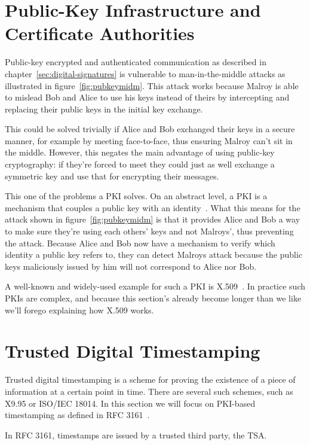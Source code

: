 \section{Public-Key Infrastructure and Certificate Authorities}\label{sec:public-key-infrastructure-and-certificate-authorities}
Public-key encrypted and authenticated communication as described in chapter~\ref{sec:digital-signatures}
is vulnerable to man-in-the-middle attacks as illustrated in figure~\ref{fig:pubkeymidm}.
This attack works because Malroy is able to mislead Bob and Alice to use his keys instead of theirs
by intercepting and replacing their public keys in the initial key exchange.

This could be solved trivially if Alice and Bob exchanged their keys in a secure manner,
for example by meeting face-to-face,
thus ensuring Malroy can't sit in the middle.
However, this negates the main advantage of using public-key cryptography:
if they're forced to meet they could just as well exchange a symmetric key and use that for encrypting
their messages.

This one of the problems a \gls{PKI} solves.
On an abstract level, a \gls{PKI} is a mechanism that couples a public key with an identity~\cite{whatispki}.
What this means for the attack shown in figure~\ref{fig:pubkeymidm} is that it provides Alice and Bob
a way to make sure they're using each others' keys and not Malroys',
thus preventing the attack.
Because Alice and Bob now have a mechanism to verify which identity a public key refers to,
they can detect Malroys attack because the public keys maliciously issued by him will not correspond to Alice nor Bob.

A well-known and widely-used example for such a \gls{PKI} is X.509~\cite{x509}.
In practice such \gls{PKI}s are complex,
and because this section's already become longer than we like we'll forego explaining how X.509 works.

\section{Trusted Digital Timestamping}\label{sec:timestamps}
Trusted digital timestamping is a scheme for proving the existence of a piece of information at a certain point in time.
There are several such schemes, such as X9.95 or ISO/IEC 18014.
In this section we will focus on \gls{PKI}-based timestamping as defined in RFC 3161~\cite{rfc3161}.

In RFC 3161, timestamps are issued by a trusted third party, the \acrfull{TSA}.

